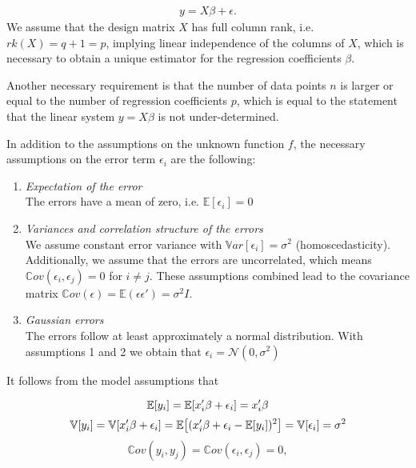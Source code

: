\begin{align}
	y = X\beta + \epsilon.
\end{align}
We assume that the design matrix $X$ has full column rank, i.e. $rk(X) = q + 1 = p$, implying linear independence of the columns of $X$, which is necessary to obtain a unique estimator for the regression coefficients $\beta$. \cite{fahrmeir2013regression}

Another necessary requirement is that the number of data points $n$ is larger or equal to the number of regression coefficients $p$, which is equal to the statement that the linear system $y = X\beta$ is not under-determined.

In addition to the assumptions on the unknown function $f$, the necessary assumptions on the error term $\epsilon_i$ are the following:

\begin{enumerate}
	\item \emph{Expectation of the error} \\
	The errors have a mean of zero, i.e. $\mathbb E[\epsilon_i] = 0$

	\item \emph{Variances and correlation structure of the errors} \\
	We assume constant error variance with $\mathbb Var[\epsilon_i] = \sigma^2$ (homoscedasticity). Additionally, we assume that the errors are uncorrelated, which means $\mathbb Cov(\epsilon_i, \epsilon_j) = 0$ for $i \ne j$. These assumptions combined lead to the covariance matrix $\mathbb Cov(\epsilon) = \mathbb E(\epsilon \epsilon') 	= \sigma^2 I$.

	\item \emph{Gaussian errors} \\
	The errors follow at least approximately a normal distribution. With assumptions 1 and 2 we obtain that $\epsilon_i = \mathcal N(0, \sigma^2)$ 
\end{enumerate}

It follows from the model assumptions that 

\begin{equation}
\mathbb E[y_i] = \mathbb E [x_i'\beta + \epsilon_i] = x_i'\beta \\
\end{equation}
\begin{equation}
\mathbb V[y_i] = \mathbb V[x_i'\beta + \epsilon_i] = \mathbb{E}\big[(x_i'\beta + \epsilon_i - \mathbb{E}[y_i])^2\big] = \mathbb V[\epsilon_i] = \sigma^2 \\
\end{equation}
\begin{equation}
\mathbb Cov(y_i, y_j) = \mathbb Cov(\epsilon_i, \epsilon_j) = 0, 
\end{equation}
	
